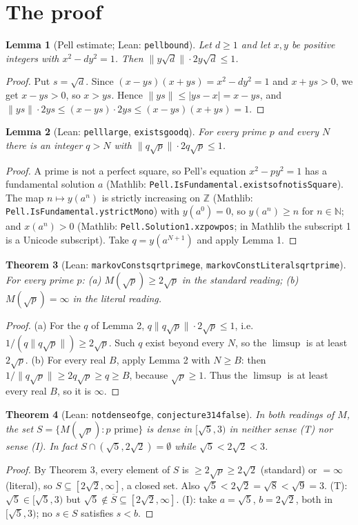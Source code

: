 \documentclass[11pt]{article}
\renewcommand{\_}{\oldus\allowbreak}
\newtheorem{theorem}{Theorem}
\newtheorem{lemma}[theorem]{Lemma}
\theoremstyle{definition}
\theoremstyle{remark}
\begin{document}
\section{The proof}
\begin{lemma}[Pell estimate; Lean: \texttt{pell\_bound}]
Let $d\ge1$ and let $x,y$ be positive integers with $x^2-dy^2=1$. Then
$\|y\sqrt d\|\cdot 2y\sqrt d\le 1$.
\end{lemma}
\begin{proof}
Put $s=\sqrt d$. Since $(x-ys)(x+ys)=x^2-dy^2=1$ and $x+ys>0$, we get $x-ys>0$, so $x>ys$.
Hence $\|ys\|\le|ys-x| = x-ys$, and
$\|ys\|\cdot 2ys \le (x-ys)\cdot 2ys\le (x-ys)(x+ys)=1$.
\end{proof}

\begin{lemma}[Lean: \texttt{pell\_large}, \texttt{exists\_good\_q}]
For every prime $p$ and every $N$ there is an integer $q> N$ with
$\|q\sqrt p\|\cdot 2q\sqrt p\le1$.
\end{lemma}
\begin{proof}
A prime is not a perfect square, so Pell's equation $x^2-py^2=1$ has a fundamental solution $a$
(Mathlib: \texttt{Pell.IsFundamental.exists\_of\_not\_isSquare}). The map $n\mapsto y(a^n)$ is
strictly increasing on $\mathbb Z$ (Mathlib: \texttt{Pell.IsFundamental.y\_strictMono}) with
$y(a^0)=0$, so $y(a^n)\ge n$ for $n\in\mathbb N$; and $x(a^n)>0$
(Mathlib: \texttt{Pell.Solution\_1.x\_zpow\_pos}; in Mathlib the subscript 1 is a Unicode subscript). Take $q=y(a^{N+1})$ and apply Lemma 1.
\end{proof}

\begin{theorem}[Lean: \texttt{markovConst\_sqrt\_prime\_ge}, \texttt{markovConstLiteral\_sqrt\_prime}]
For every prime $p$: (a) $M(\sqrt p)\ge 2\sqrt p$ in the standard reading;
(b) $M(\sqrt p)=\infty$ in the literal reading.
\end{theorem}
\begin{proof}
(a) For the $q$ of Lemma 2, $q\|q\sqrt p\|\cdot 2\sqrt p\le1$, i.e.\ $1/(q\|q\sqrt p\|)\ge2\sqrt p$.
Such $q$ exist beyond every $N$, so the $\limsup$ is at least $2\sqrt p$.
(b) For every real $B$, apply Lemma 2 with $N\ge B$: then $1/\|q\sqrt p\|\ge 2q\sqrt p\ge q\ge B$,
because $\sqrt p\ge1$. Thus the $\limsup$ is at least every real $B$, so it is $\infty$.
\end{proof}

\begin{theorem}[Lean: \texttt{not\_dense\_of\_ge}, \texttt{conjecture314\_false}]
In both readings of $M$, the set $S=\{M(\sqrt p):p\text{ prime}\}$ is dense in $[\sqrt5,3)$ in
neither sense (T) nor sense (I). In fact $S\cap(\sqrt5,2\sqrt2)=\emptyset$ while
$\sqrt5<2\sqrt2<3$.
\end{theorem}
\begin{proof}
By Theorem 3, every element of $S$ is $\ge 2\sqrt p\ge2\sqrt2$ (standard) or $=\infty$ (literal), so
$S\subseteq[2\sqrt2,\infty]$, a closed set. Also $\sqrt5<2\sqrt2=\sqrt8<\sqrt9=3$.
(T): $\sqrt5\in[\sqrt5,3)$ but $\sqrt5\notin\overline S\subseteq[2\sqrt2,\infty]$.
(I): take $a=\sqrt5$, $b=2\sqrt2$, both in $[\sqrt5,3)$; no $s\in S$ satisfies $s<b$.
\end{proof}
\end{document}
